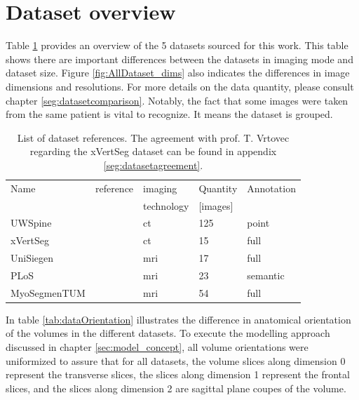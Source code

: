 \section{Dataset overview}
\par{
    Table \ref{tab:datasetReferences} provides an overview of the 5 datasets sourced for this work.
    This table shows there are important differences between the datasets in imaging mode and dataset size.
    Figure \ref{fig:AllDataset_dims} also indicates the differences in image dimensions and resolutions.
    For more details on the data quantity, please consult chapter \ref{seg:datasetcomparison}. 
    Notably, the fact that some images were taken from the same patient is vital to recognize. It means the dataset is grouped. 
}
\begin{table}
 
    \begin{tabular}{ l l l l l} 
     \toprule
     Name & reference & imaging & Quantity & Annotation \\
          &           & technology & [images] & \\
     \hline 
    UWSpine & \cite{Glocker}  & \acrshort{ct} & 125 & point  \\ 
    xVertSeg & \cite{Ibragimov2014, Korez2015} & \acrshort{ct} & 15 & full \\
    UniSiegen  & \cite{Zukic2014} & \acrshort{mri} & 17 & full \\
    PLoS & \cite{Chu2015} & \acrshort{mri} & 23 & semantic \\
    MyoSegmenTUM & \cite{Burian2019} & \acrshort{mri} &  54 & full \\
     \bottomrule
    \end{tabular}
    \caption{List of dataset references. 
    The agreement with prof. T. Vrtovec regarding the xVertSeg dataset can be found in appendix \ref{seg:datasetagreement}.\label{tab:datasetReferences}}

\end{table}
\par{
    In table \ref{tab:dataOrientation} illustrates the difference in anatomical orientation of the volumes in the different datasets.
    To execute the modelling approach discussed in chapter \ref{sec:model_concept}, all volume orientations were uniformized to assure that for all datasets, the volume slices along dimension 0 represent the transverse slices, 
    the slices along dimension 1 represent the frontal slices, and the slices along dimension 2 are sagittal plane coupes of the volume.
}
